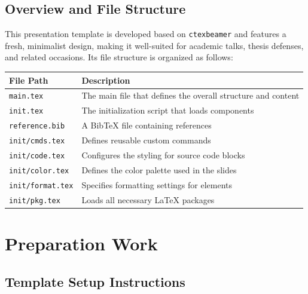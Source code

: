 \documentclass[8pt]{beamer}
\begin{document}
\makesection

\subsection{Overview and File Structure}

\begin{frame}{\insertsection}{\insertsubsection}

    This presentation template is developed based on \lstinline|ctexbeamer| and features a fresh, minimalist design, making it well-suited for academic talks, thesis defenses, and related occasions. Its file structure is organized as follows:

    \begin{table}
        \renewcommand{\arraystretch}{1.5}
        \centering
        \begin{tabular}{ll}
            \toprule
            File Path & Description \\
            \midrule
            \lstinline|main.tex| & The main file that defines the overall structure and content \\
            \lstinline|init.tex| & The initialization script that loads components \\
            \lstinline|reference.bib| & A BibTeX file containing references \\
            \lstinline|init/cmds.tex| & Defines reusable custom commands \\
            \lstinline|init/code.tex| & Configures the styling for source code blocks \\
            \lstinline|init/color.tex| & Defines the color palette used in the slides \\
            \lstinline|init/format.tex| & Specifies formatting settings for elements \\
            \lstinline|init/pkg.tex| & Loads all necessary LaTeX packages \\
            \bottomrule
        \end{tabular}
    \end{table}

\end{frame}

\section{Preparation Work}

\makesection

\subsection{Template Setup Instructions}
\end{document}
